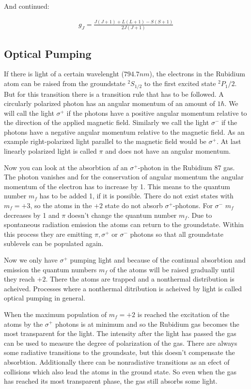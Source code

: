 And continued:

\begin{align}
g_J=\frac{J\left(J+1\right)+L\left(L+1\right)-S\left(S+1\right)}{2J\left(J+1\right)}
\end{align}

\subsection{Optical Pumping}
If there is light of a certain wavelenght ($794.7nm$), the electrons in the Rubidium atom can be raised from the groundstate $^2S_{1/2}$ to the first excited state $^2P_1/2$. But for this transition there is a transition rule that has to be followed. A circularly polarized photon has an angular momentum of an amount of $1\hbar$. We will call the light $\sigma^+$ if the photons have a positive angular momentum relative to the direction of the applied magnetic field. Similarly we call the light $\sigma^-$ if the photons have a negative angular momentum relative to the magnetic field. As an example right-polarized light parallel to the magnetic field would be $\sigma^+$. At last linearly polarized light is called $\pi$ and does not have an angular momentum.

Now you can look at the absorbtion af an $\sigma^+$-photon in the Rubidium 87 gas. The photon vanishes and for the conservation of angular momentum the angular momentum of the electron has to increase by 1. This means to the quantum number $m_f$ has to be added 1, if it is possible. There do not exist states with $m_f=+3$, so the atoms in the $+2$ state do not absorb $\sigma^+$-photons. For $\sigma^-$ $m_f$ decreases by 1 and $\pi$ doesn't change the quantum number $m_f$. Due to spontaneous radiation emission the atoms can return to the groundstate. Within this process they are emitting $\pi, \sigma^+$ or $\sigma^-$ photons so that all groundstate sublevels can be populated again.

Now we only have $\sigma^+$ pumping light and because of the continual absorbtion and emission the quantum numbers $m_f$ of the atoms will be raised gradually until they reach $+2$. There the atoms are trapped and a nonthermal distribution is acheived. Processes where a nonthermal ditribution is acheived by light is called optical pumping in general.

When the maximum population of $m_f=+2$ is reached the excitation of the atoms by the $\sigma^+$ photons is at minimum and so the Rubidium gas becomes the most transparent for the light. The intensity after the light has passed the gas can be used to measure the degree of polarization of the gas. There are always some radiative transitions to the groundsate, but this doesn't compensate the absorbtion. Additionally there can be nonradiative transitions as an efect of collisions which also lead the atoms in the ground state. So even  when the gas has reached its most transparent phase, the gas still absorbs some light.







